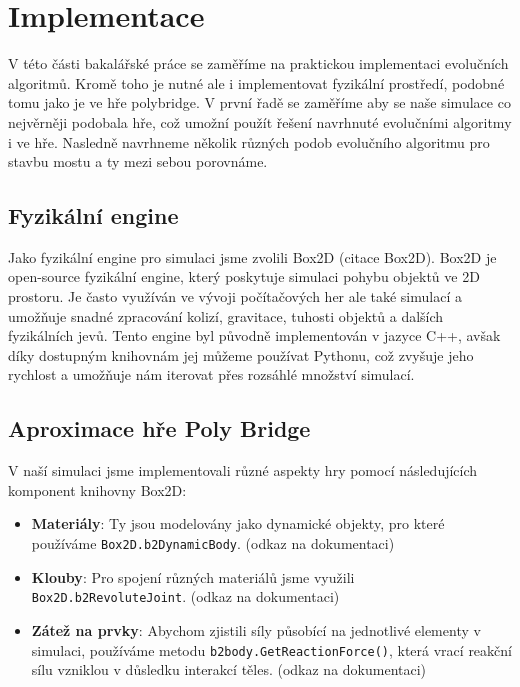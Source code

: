 \chapter{Implementace}

V této části bakalářské práce se zaměříme na praktickou implementaci evolučních algoritmů. Kromě toho je nutné ale i implementovat fyzikální prostředí, podobné tomu jako je ve hře polybridge. V první řadě se zaměříme aby se naše simulace co nejvěrněji podobala hře, což umožní použít řešení navrhnuté evolučními algoritmy i ve hře. Nasledně navrhneme několik různých podob evolučního algoritmu pro stavbu mostu a ty mezi sebou porovnáme.


\section{Fyzikální engine}

Jako fyzikální engine pro simulaci jsme zvolili Box2D (citace Box2D). Box2D je open-source fyzikální engine, který poskytuje simulaci pohybu objektů ve 2D prostoru. Je často využíván ve vývoji počítačových her ale také simulací a umožňuje snadné zpracování kolizí, gravitace, tuhosti objektů a dalších fyzikálních jevů. Tento engine byl původně implementován v jazyce C++, avšak díky dostupným knihovnám jej můžeme používat Pythonu, což zvyšuje jeho rychlost a umožňuje nám iterovat přes rozsáhlé množství simulací.

\section{Aproximace hře Poly Bridge}

V naší simulaci jsme implementovali různé aspekty hry pomocí následujících komponent knihovny Box2D:

\begin{itemize}
    \item \textbf{Materiály}: Ty jsou modelovány jako dynamické objekty, pro které používáme \texttt{Box2D.b2DynamicBody}. (odkaz na dokumentaci)
    \item \textbf{Klouby}: Pro spojení různých materiálů jsme využili \texttt{Box2D.b2RevoluteJoint}. (odkaz na dokumentaci)
    \item \textbf{Zátež na prvky}: Abychom zjistili síly působící na jednotlivé elementy v simulaci, používáme metodu \texttt{b2body.GetReactionForce()}, která vrací reakční sílu vzniklou v důsledku interakcí těles. (odkaz na dokumentaci)
\end{itemize}

